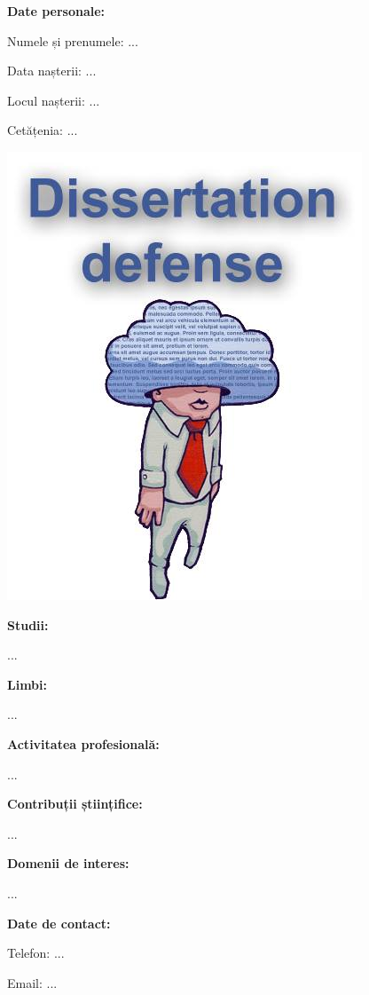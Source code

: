 \documentclass[a4paper, 12pt]{report}
\begin{document}
\begin{minipage}{0.5\textwidth}
{\bf Date personale:}

Numele și prenumele: ...

Data nașterii: ...

Locul nașterii: ...

Cetățenia: ...
\end{minipage}
%
\begin{minipage}{0.5\textwidth}
\includegraphics[scale=0.6]{eu.jpg}
\end{minipage}

{\bf Studii:}

...

{\bf Limbi:}

...

{\bf Activitatea profesională:}

...

{\bf Contribuții științifice:}

...

{\bf Domenii de interes:}

...

{\bf Date de contact:}

Telefon: ...

Email: ...
\end{document}
